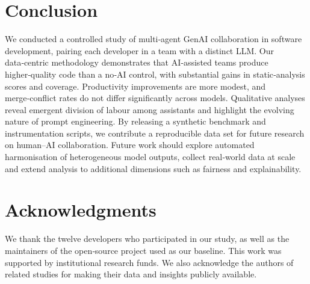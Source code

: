 \documentclass[conference]{IEEEtran}
\begin{document}
\section{Conclusion}
We conducted a controlled study of multi‑agent GenAI collaboration in software development, pairing each developer in a team with a distinct LLM.  Our data‑centric methodology demonstrates that AI‑assisted teams produce higher‑quality code than a no‑AI control, with substantial gains in static‑analysis scores and coverage.  Productivity improvements are more modest, and merge‑conflict rates do not differ significantly across models.  Qualitative analyses reveal emergent division of labour among assistants and highlight the evolving nature of prompt engineering.  By releasing a synthetic benchmark and instrumentation scripts, we contribute a reproducible data set for future research on human–AI collaboration.  Future work should explore automated harmonisation of heterogeneous model outputs, collect real‑world data at scale and extend analysis to additional dimensions such as fairness and explainability.

\section*{Acknowledgments}
We thank the twelve developers who participated in our study, as well as the maintainers of the open‑source project used as our baseline.  This work was supported by institutional research funds.  We also acknowledge the authors of related studies for making their data and insights publicly available.
\end{document}
